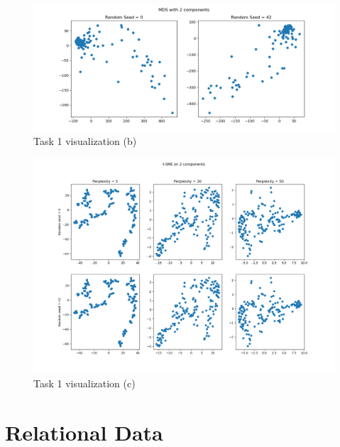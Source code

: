 \documentclass[11pt,a4paper,titlepage]{article}
\begin{document}
\begin{figure}[h]
    \centering
    \includegraphics[width=1.0\linewidth]{reports/assignment-4/imgs/mds.png}
    \caption{Task 1 visualization (b)}
    \label{fig:mds}
\end{figure}

\begin{figure}[h]
    \centering
    \includegraphics[width=1.0\linewidth]{reports/assignment-4/imgs/tsne.png}
    \caption{Task 1 visualization (c)}
    \label{fig:tsne}
\end{figure}

\section{Relational Data}
\end{document}
